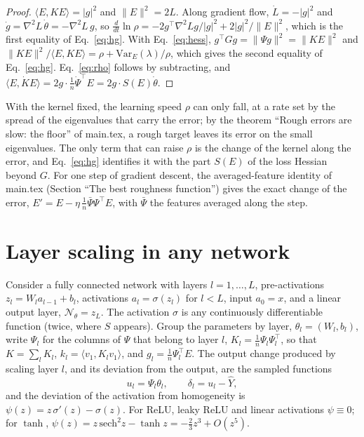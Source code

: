 \documentclass[11pt]{article}
\theoremstyle{definition}
\theoremstyle{remark}
\newcommand{\Net}{\mathcal{N}_\theta}
\newcommand{\ip}[2]{\langle #1,#2\rangle}
\begin{document}
\begin{proof}
$\ip{E}{KE} = |g|^2$ and $\|E\|^2 = 2L$. Along gradient flow, $\dot L = -|g|^2$ and $\dot g = \nabla^2L\,\dot\theta = -\nabla^2L\,g$, so $\frac{d}{dt}\ln\rho = -2g^\top\nabla^2Lg/|g|^2 + 2|g|^2/\|E\|^2$, which is the first equality of Eq.~\eqref{eq:hg}.
With Eq.~\eqref{eq:hess}, $g^\top Gg = \|\Psi g\|^2 = \|KE\|^2$ and $\|KE\|^2/\ip{E}{KE} = \rho + \mathrm{Var}_E(\lambda)/\rho$, which gives the second equality of Eq.~\eqref{eq:hg}.
Eq.~\eqref{eq:rho} follows by subtracting, and $\ip{E}{\dot KE} = 2g\cdot\frac1n\dot\Psi^\top E = 2g\cdot S(E)\dot\theta$.
\end{proof}

With the kernel fixed, the learning speed $\rho$ can only fall, at a rate set by the spread of the eigenvalues that carry the error; by the theorem ``Rough errors are slow: the floor'' of main.tex, a rough target leaves its error on the small eigenvalues.
The only term that can raise $\rho$ is the change of the kernel along the error, and Eq.~\eqref{eq:hg} identifies it with the part $S(E)$ of the loss Hessian beyond $G$.
For one step of gradient descent, the averaged-feature identity of main.tex (Section ``The best roughness function'') gives the exact change of the error, $E' = E - \eta\,\frac1n\bar\Psi\Psi^\top E$, with $\bar\Psi$ the features averaged along the step.

\section{Layer scaling in any network}\label{sec:homog}

Consider a fully connected network with layers $l = 1,\dots,L$, pre-activations $z_l = W_la_{l-1} + b_l$, activations $a_l = \sigma(z_l)$ for $l < L$, input $a_0 = x$, and a linear output layer, $\Net = z_L$.
The activation $\sigma$ is any continuously differentiable function (twice, where $S$ appears).
Group the parameters by layer, $\theta_l = (W_l, b_l)$, write $\Psi_l$ for the columns of $\Psi$ that belong to layer $l$, $K_l = \frac1n\Psi_l\Psi_l^\top$, so that $K = \sum_lK_l$, $k_l = \ip{v_1}{K_lv_1}$, and $g_l = \frac1n\Psi_l^\top E$.
The output change produced by scaling layer $l$, and its deviation from the output, are the sampled functions
\begin{equation}\label{eq:ul}
u_l = \Psi_l\theta_l,\qquad \delta_l = u_l - \hat Y,
\end{equation}
and the deviation of the activation from homogeneity is $\psi(z) = z\,\sigma'(z) - \sigma(z)$.
For ReLU, leaky ReLU and linear activations $\psi\equiv0$; for $\tanh$, $\psi(z) = z\,\mathrm{sech}^2z - \tanh z = -\frac23z^3 + O(z^5)$.
\end{document}
